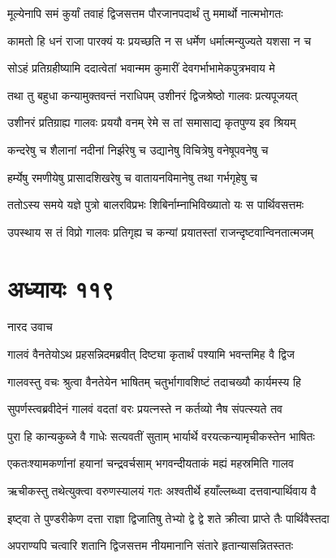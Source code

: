 \twolineshloka
{मूल्येनापि समं कुर्यां तवाहं द्विजसत्तम}
{पौरजानपदार्थं तु ममार्थो नात्मभोगतः}


\twolineshloka
{कामतो हि धनं राजा पारक्यं यः प्रयच्छति}
{न स धर्मेण धर्मात्मन्युज्यते यशसा न च}


\twolineshloka
{सोऽहं प्रतिग्रहीष्यामि ददात्वेतां भवान्मम}
{कुमारीं देवगर्भाभामेकपुत्रभवाय मे}


\twolineshloka
{तथा तु बहुधा कन्यामुक्तवन्तं नराधिपम्}
{उशीनरं द्विजश्रेष्ठो गालवः प्रत्यपूजयत्}


\twolineshloka
{उशीनरं प्रतिग्राह्य गालवः प्रययौ वनम्}
{रेमे स तां समासाद्य कृतपुण्य इव श्रियम्}


\twolineshloka
{कन्दरेषु च शैलानां नदीनां निर्झरेषु च}
{उद्यानेषु विचित्रेषु वनेषूपवनेषु च}


\twolineshloka
{हर्म्येषु रमणीयेषु प्रासादशिखरेषु च}
{वातायनविमानेषु तथा गर्भगृहेषु च}


\twolineshloka
{ततोऽस्य समये यज्ञे पुत्रो बालरविप्रभः}
{शिबिर्नाम्नाभिविख्यातो यः स पार्थिवसत्तमः}


\twolineshloka
{उपस्थाय स तं विप्रो गालवः प्रतिगृह्य च}
{कन्यां प्रयातस्तां राजन्दृष्टवान्विनतात्मजम्}


\chapter{अध्यायः ११९}
\twolineshloka
{नारद उवाच}
{}


\twolineshloka
{गालवं वैनतेयोऽथ प्रहसन्निदमब्रवीत्}
{दिष्ट्या कृतार्थं पश्यामि भवन्तमिह वै द्विज}


\twolineshloka
{गालवस्तु वचः श्रुत्वा वैनतेयेन भाषितम्}
{चतुर्भागावशिष्टं तदाचख्यौ कार्यमस्य हि}


\twolineshloka
{सुपर्णस्त्वब्रवीदेनं गालवं वदतां वरः}
{प्रयत्नस्ते न कर्तव्यो नैष संपत्स्यते तव}


\twolineshloka
{पुरा हि कान्यकुब्जे वै गाधेः सत्यवतीं सुताम्}
{भार्यार्थे वरयत्कन्यामृचीकस्तेन भाषितः}


\twolineshloka
{एकतःश्यामकर्णानां हयानां चन्द्रवर्चसाम्}
{भगवन्दीयताकं मह्यं महस्रमिति गालव}


\twolineshloka
{ऋचीकस्तु तथेत्युक्त्वा वरुणस्यालयं गतः}
{अश्वतीर्थे हयाँल्लब्ध्वा दत्तवान्पार्थिवाय वै}


\twolineshloka
{इष्ट्वा ते पुण्डरीकेण दत्ता राज्ञा द्विजातिषु}
{तेभ्यो द्वे द्वे शते क्रीत्वा प्राप्ते तैः पार्थिवैस्तदा}


\twolineshloka
{अपराण्यपि चत्वारि शतानि द्विजसत्तम}
{नीयमानानि संतारे हृतान्यासन्नितस्ततः}


